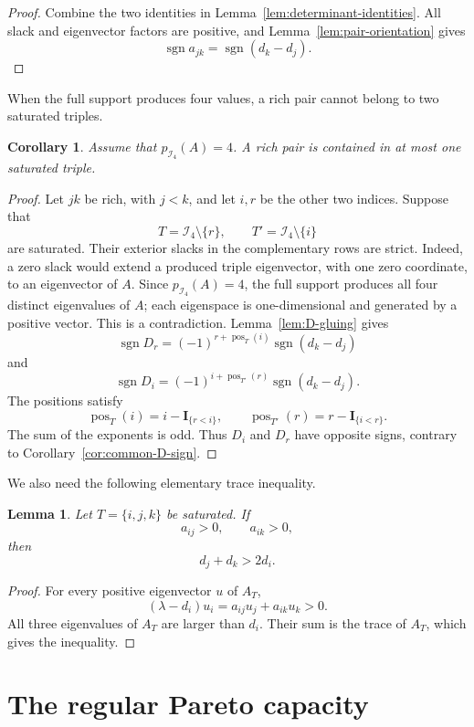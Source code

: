 \documentclass[11pt,a4paper]{article}
\newtheorem{lemma}[theorem]{Lemma}
\newtheorem{corollary}[theorem]{Corollary}
\theoremstyle{definition}
\newcommand{\Ind}{\mathcal I}
\newcommand{\indic}{\mathbf I}
\DeclareMathOperator{\sgn}{sgn}
\begin{document}
\begin{proof}
Combine the two identities in
Lemma~\ref{lem:determinant-identities}. All slack and eigenvector
factors are positive, and Lemma~\ref{lem:pair-orientation} gives
$$
\sgn a_{jk}=\sgn(d_k-d_j).
$$
\end{proof}

When the full support produces four values, a rich pair cannot belong
to two saturated triples.

\begin{corollary}
\label{cor:rich-edge-occupancy}
Assume that $p_{\Ind_4}(A)=4$. A rich pair is contained in at most one
saturated triple.
\end{corollary}

\begin{proof}
Let $jk$ be rich, with $j<k$, and let $i,r$ be the other two indices.
Suppose that
$$
T=\Ind_4\setminus\{r\},
\qquad
T'=\Ind_4\setminus\{i\}
$$
are saturated. Their exterior slacks in the complementary rows are
strict. Indeed, a zero slack would extend a produced triple
eigenvector, with one zero coordinate, to an eigenvector of $A$.
Since $p_{\Ind_4}(A)=4$, the full support produces all four distinct
eigenvalues of $A$; each eigenspace is one-dimensional and generated
by a positive vector.
This is a contradiction.
Lemma~\ref{lem:D-gluing} gives
$$
\sgn D_r
=
(-1)^{r+\operatorname{pos}_T(i)}
\sgn(d_k-d_j)
$$
and
$$
\sgn D_i
=
(-1)^{i+\operatorname{pos}_{T'}(r)}
\sgn(d_k-d_j).
$$
The positions satisfy
$$
\operatorname{pos}_T(i)
=
i-\indic_{\{r<i\}},
\qquad
\operatorname{pos}_{T'}(r)
=
r-\indic_{\{i<r\}}.
$$
The sum of the exponents is odd. Thus $D_i$ and $D_r$ have opposite
signs, contrary to Corollary~\ref{cor:common-D-sign}.
\end{proof}

We also need the following elementary trace inequality.

\begin{lemma}
\label{lem:trace}
Let $T=\{i,j,k\}$ be saturated. If
$$
a_{ij}>0,
\qquad
a_{ik}>0,
$$
then
$$
d_j+d_k>2d_i.
$$
\end{lemma}

\begin{proof}
For every positive eigenvector $u$ of $A_T$,
$$
(\lambda-d_i)u_i
=
a_{ij}u_j+a_{ik}u_k
>0.
$$
All three eigenvalues of $A_T$ are larger than $d_i$. Their sum is the
trace of $A_T$, which gives the inequality.
\end{proof}

\section{The regular Pareto capacity}
\label{sec:regular-capacity}
\end{document}
